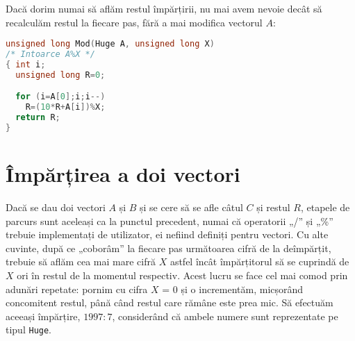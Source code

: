 Dacă dorim numai să aflăm restul împărțirii, nu mai avem nevoie decât să
recalculăm restul la fiecare pas, fără a mai modifica vectorul $A$:

\begin{lstlisting}[language=C]
unsigned long Mod(Huge A, unsigned long X)
/* Intoarce A%X */
{ int i;
  unsigned long R=0;

  for (i=A[0];i;i--)
    R=(10*R+A[i])%X;
  return R;
}
\end{lstlisting}

\section{Împărțirea a doi vectori}

Dacă se dau doi vectori $A$ și $B$ și se cere să se afle câtul $C$ și restul
$R$, etapele de parcurs sunt aceleași ca la punctul precedent, numai că
operatorii „/” și „\%” trebuie implementați de utilizator, ei nefiind definiți
pentru vectori. Cu alte cuvinte, după ce „coborâm” la fiecare pas următoarea
cifră de la deîmpărțit, trebuie să aflăm cea mai mare cifră $X$ astfel încât
împărțitorul să se cuprindă de $X$ ori în restul de la momentul
respectiv. Acest lucru se face cel mai comod prin adunări repetate: pornim cu
cifra $X$ = 0 și o incrementăm, micșorând concomitent restul, până când restul
care rămâne este prea mic. Să efectuăm aceeași împărțire, $1997:7$, considerând
că ambele numere sunt reprezentate pe tipul {\tt Huge}.


